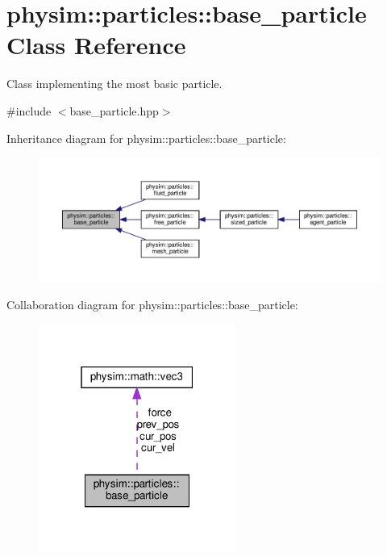 \hypertarget{classphysim_1_1particles_1_1base__particle}{}\section{physim\+:\+:particles\+:\+:base\+\_\+particle Class Reference}
\label{classphysim_1_1particles_1_1base__particle}


Class implementing the most basic particle.  




{\ttfamily \#include $<$base\+\_\+particle.\+hpp$>$}



Inheritance diagram for physim\+:\+:particles\+:\+:base\+\_\+particle\+:\nopagebreak
\begin{figure}[H]
\begin{center}
\leavevmode
\includegraphics[width=350pt]{classphysim_1_1particles_1_1base__particle__inherit__graph}
\end{center}
\end{figure}


Collaboration diagram for physim\+:\+:particles\+:\+:base\+\_\+particle\+:\nopagebreak
\begin{figure}[H]
\begin{center}
\leavevmode
\includegraphics[width=183pt]{classphysim_1_1particles_1_1base__particle__coll__graph}
\end{center}
\end{figure}
